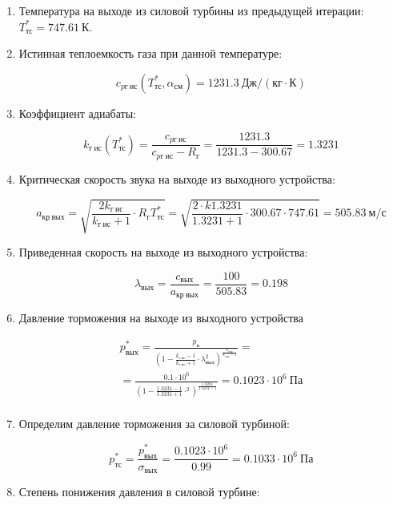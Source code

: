 \documentclass[a4paper,10pt]{article}
\begin{document}
\begin{enumerate}
\begin{enumerate}
	\end{enumerate}
	
	\item Температура на выходе из силовой турбины из предыдущей итерации: $ T_{тс}^* = 747.61\ К$.

	\item Истинная теплоемкость газа при данной температуре:
	
	\[ c_{pг\ ис} (T_{тс}^*, \alpha_{см}) = 1231.3\ Дж/ (кг \cdot К) \]
	
	\item Коэффициент адиабаты:
	
	\[
	k_{г\ ис} (T_{тс}^*)  = \frac{ c_{pг\ ис} }{ c_{pг\ ис} - R_г } = 
			\frac{ 1231.3 }{ 1231.3 - 300.67 } = 
			1.3231
	\]

	\item Критическая скорость звука на выходе из выходного устройства:

	\[
		a_{кр\ вых} = \sqrt{\frac{2 k_{г\ ис}}{k_{г\ ис} + 1} \cdot R_г T_{тс}^* } =
		\sqrt{
			\frac{2 \cdot k1.3231
			}{
			1.3231 + 1} \cdot
			300.67 \cdot 747.61
		} =
		505.83\ м/с
	\]

	\item Приведенная скорость на выходе из выходного устройства:

	\[
		\lambda_{вых} = \frac{c_{вых}}{a_{кр\ вых}} =
			\frac{100}{505.83} =
		0.198
	\]

	\item Давление торможения на выходе из выходного устройства
	
	\begin{gather*}
	    p_{вых}^* = \frac{ p_н
				}{
					\left(
						1 - \frac{ k_{г\ ис} - 1 }{ k_{г\ ис} + 1 } \cdot \lambda_{вых} ^ 2
					\right)
						^ {
							\frac{ k_{г\ ис} }{ k_{г\ ис} - 1 }
						}
				} =\\
	    = \frac{ 0.1 \cdot 10^6
		}{
			\left(
				1 - \frac{ 1.3231 - 1 }{ 1.3231 + 1 } \cdot  ^ 2
			\right)
				^ {
					\frac{ 1.3231 }{ 1.3231 - 1 }
				}
				} =
		0.1023 \cdot 10^6\ Па\\
	\end{gather*}
	
	\item Определим давление торможения за силовой турбиной:
	
	\[
	p_{тс}^* = \frac{ p_{вых}^* }{ \sigma_{вых} } = \frac{ 0.1023 \cdot 10^6 }{ 0.99 } =
			0.1033 \cdot 10^6\ Па
	\]

	\item Степень понижения давления в силовой турбине:
	

\end{enumerate}
\end{document}
